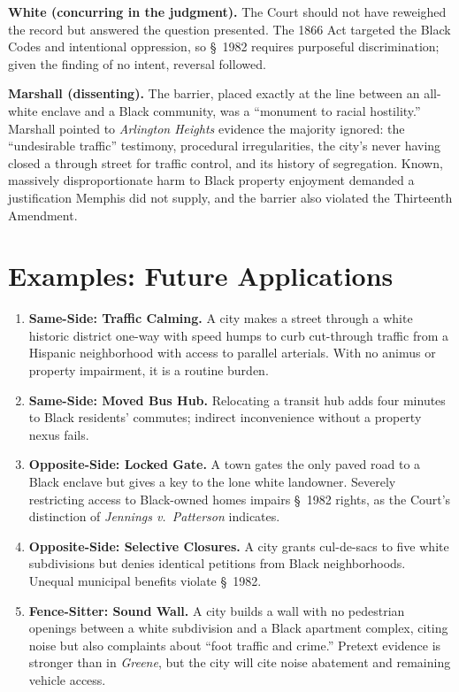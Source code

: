 \documentclass[12pt]{article}
\begin{document}
\textbf{White (concurring in the judgment).} The Court should not have reweighed the record but answered the question presented. The 1866 Act targeted the Black Codes and intentional oppression, so \S~1982 requires purposeful discrimination; given the finding of no intent, reversal followed.

\textbf{Marshall (dissenting).} The barrier, placed exactly at the line between an all-white enclave and a Black community, was a ``monument to racial hostility.'' Marshall pointed to \textit{Arlington Heights} evidence the majority ignored: the ``undesirable traffic'' testimony, procedural irregularities, the city's never having closed a through street for traffic control, and its history of segregation. Known, massively disproportionate harm to Black property enjoyment demanded a justification Memphis did not supply, and the barrier also violated the Thirteenth Amendment.

\section{Examples: Future Applications}

\begin{enumerate}
\item \textbf{Same-Side: Traffic Calming.} A city makes a street through a white historic district one-way with speed humps to curb cut-through traffic from a Hispanic neighborhood with access to parallel arterials. With no animus or property impairment, it is a routine burden.
\item \textbf{Same-Side: Moved Bus Hub.} Relocating a transit hub adds four minutes to Black residents' commutes; indirect inconvenience without a property nexus fails.
\item \textbf{Opposite-Side: Locked Gate.} A town gates the only paved road to a Black enclave but gives a key to the lone white landowner. Severely restricting access to Black-owned homes impairs \S~1982 rights, as the Court's distinction of \textit{Jennings v.\ Patterson} indicates.
\item \textbf{Opposite-Side: Selective Closures.} A city grants cul-de-sacs to five white subdivisions but denies identical petitions from Black neighborhoods. Unequal municipal benefits violate \S~1982.
\item \textbf{Fence-Sitter: Sound Wall.} A city builds a wall with no pedestrian openings between a white subdivision and a Black apartment complex, citing noise but also complaints about ``foot traffic and crime.'' Pretext evidence is stronger than in \textit{Greene}, but the city will cite noise abatement and remaining vehicle access.
\end{enumerate}
\end{document}
